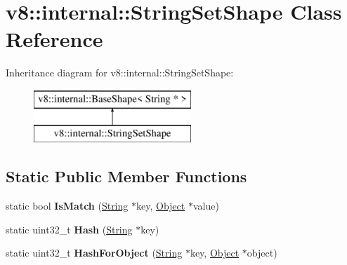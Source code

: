 \hypertarget{classv8_1_1internal_1_1_string_set_shape}{}\section{v8\+:\+:internal\+:\+:String\+Set\+Shape Class Reference}
\label{classv8_1_1internal_1_1_string_set_shape}
Inheritance diagram for v8\+:\+:internal\+:\+:String\+Set\+Shape\+:\begin{figure}[H]
\begin{center}
\leavevmode
\includegraphics[height=2.000000cm]{classv8_1_1internal_1_1_string_set_shape}
\end{center}
\end{figure}
\subsection*{Static Public Member Functions}
\begin{DoxyCompactItemize}
\item 
static bool {\bfseries Is\+Match} (\hyperlink{classv8_1_1internal_1_1_string}{String} $\ast$key, \hyperlink{classv8_1_1internal_1_1_object}{Object} $\ast$value)\hypertarget{classv8_1_1internal_1_1_string_set_shape_aaa2b8da07ae1eed38d1191a73318d0d5}{}\label{classv8_1_1internal_1_1_string_set_shape_aaa2b8da07ae1eed38d1191a73318d0d5}

\item 
static uint32\+\_\+t {\bfseries Hash} (\hyperlink{classv8_1_1internal_1_1_string}{String} $\ast$key)\hypertarget{classv8_1_1internal_1_1_string_set_shape_a9727196b11a75ac6f930dadfdb62e92d}{}\label{classv8_1_1internal_1_1_string_set_shape_a9727196b11a75ac6f930dadfdb62e92d}

\item 
static uint32\+\_\+t {\bfseries Hash\+For\+Object} (\hyperlink{classv8_1_1internal_1_1_string}{String} $\ast$key, \hyperlink{classv8_1_1internal_1_1_object}{Object} $\ast$object)\hypertarget{classv8_1_1internal_1_1_string_set_shape_a2d20db846348b5bc90c040a53f4c9bfa}{}\label{classv8_1_1internal_1_1_string_set_shape_a2d20db846348b5bc90c040a53f4c9bfa}

\end{DoxyCompactItemize}
